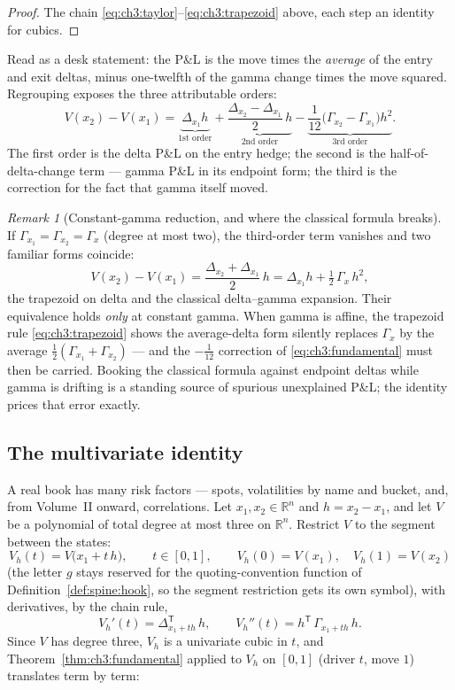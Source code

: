 \documentclass[11pt]{book}
\theoremstyle{plain}
\theoremstyle{definition}
\theoremstyle{remark}
\newtheorem{remark}[theorem]{Remark}
\begin{document}
\begin{proof}
The chain \eqref{eq:ch3:taylor}--\eqref{eq:ch3:trapezoid} above, each step an
identity for cubics.
\end{proof}

Read as a desk statement: the P\&L is the move times the \emph{average} of the
entry and exit deltas, minus one-twelfth of the gamma change times the move
squared. Regrouping exposes the three attributable orders:
\begin{equation}\label{eq:ch3:three-orders}
  V(x_2) - V(x_1)
  = \underbrace{\Delta_{x_1} h}_{\text{1st order}}
  + \underbrace{\frac{\Delta_{x_2} - \Delta_{x_1}}{2}\, h}_{\text{2nd order}}
  - \underbrace{\frac{1}{12}\bigl(\Gamma_{x_2} - \Gamma_{x_1}\bigr)
    h^2}_{\text{3rd order}} .
\end{equation}
The first order is the delta P\&L on the entry hedge; the second is the
half-of-delta-change term --- gamma P\&L in its endpoint form; the third is
the correction for the fact that gamma itself moved.

\begin{remark}[Constant-gamma reduction, and where the classical formula
breaks]\label{rem:ch3:constant-gamma}
If $\Gamma_{x_1} = \Gamma_{x_2} = \Gamma_{x}$ (degree at most two), the
third-order term vanishes and two familiar forms coincide:
\[
  V(x_2) - V(x_1)
  = \frac{\Delta_{x_2} + \Delta_{x_1}}{2}\, h
  = \Delta_{x_1} h + \tfrac{1}{2}\,\Gamma_{x}\, h^2 ,
\]
the trapezoid on delta and the classical delta--gamma expansion. Their
equivalence holds \emph{only} at constant gamma. When gamma is affine, the
trapezoid rule \eqref{eq:ch3:trapezoid} shows the average-delta form silently
replaces $\Gamma_{x}$ by the average $\tfrac{1}{2}(\Gamma_{x_1}+\Gamma_{x_2})$
--- and the $-\tfrac{1}{12}$ correction of \eqref{eq:ch3:fundamental} must
then be carried. Booking the classical formula against endpoint deltas while
gamma is drifting is a standing source of spurious unexplained P\&L; the
identity prices that error exactly.
\end{remark}

\subsection{The multivariate identity}\label{sec:ch3:multivariate}

A real book has many risk factors --- spots, volatilities by name and bucket,
and, from Volume~II onward, correlations. Let $x_1, x_2 \in \mathbb{R}^n$ and
$h = x_2 - x_1$, and let $V$ be a polynomial of total degree at most three on
$\mathbb{R}^n$. Restrict $V$ to the segment between the states:
\[
  V_h(t) = V\bigl(x_1 + t\,h\bigr), \qquad t \in [0,1],
  \qquad V_h(0) = V(x_1),\quad V_h(1) = V(x_2)
\]
(the letter $g$ stays reserved for the quoting-convention function of
Definition~\ref{def:spine:hook}, so the segment restriction gets its own
symbol), with derivatives, by the chain rule,
\[
  V_h'(t) = \Delta_{x_1 + t h}^{\mathsf T}\, h,
  \qquad
  V_h''(t) = h^{\mathsf T}\, \Gamma_{x_1 + t h}\, h .
\]
Since $V$ has degree three, $V_h$ is a univariate cubic in $t$, and
Theorem~\ref{thm:ch3:fundamental} applied to $V_h$ on $[0,1]$ (driver $t$,
move $1$) translates term by term:
\end{document}
